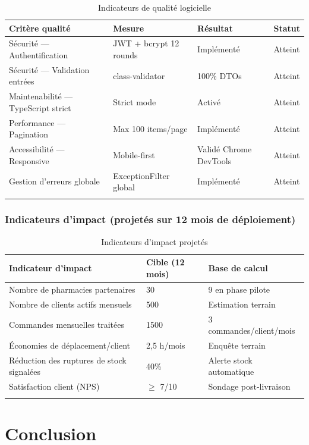 \documentclass[12pt,a4paper,oneside]{report}
\begin{document}
\begin{longtable}{L{5cm}L{3cm}L{3cm}L{3cm}}
  \toprule
  \textbf{Critère qualité} & \textbf{Mesure} & \textbf{Résultat} & \textbf{Statut} \\
  \midrule
  Sécurité — Authentification & JWT + bcrypt 12 rounds & Implémenté & Atteint \\
  Sécurité — Validation entrées & class-validator & 100\% DTOs & Atteint \\
  Maintenabilité — TypeScript strict & Strict mode & Activé & Atteint \\
  Performance — Pagination & Max 100 items/page & Implémenté & Atteint \\
  Accessibilité — Responsive & Mobile-first & Validé Chrome DevTools & Atteint \\
  Gestion d'erreurs globale & ExceptionFilter global & Implémenté & Atteint \\
  \bottomrule
  \caption{Indicateurs de qualité logicielle}
\end{longtable}

\subsection{Indicateurs d'impact (projetés sur 12 mois de déploiement)}

\begin{longtable}{L{7cm}L{3cm}L{4cm}}
  \toprule
  \textbf{Indicateur d'impact} & \textbf{Cible (12 mois)} & \textbf{Base de calcul} \\
  \midrule
  Nombre de pharmacies partenaires & 30 & 9 en phase pilote \\
  Nombre de clients actifs mensuels & 500 & Estimation terrain \\
  Commandes mensuelles traitées & 1500 & 3 commandes/client/mois \\
  Économies de déplacement/client & 2,5 h/mois & Enquête terrain \\
  Réduction des ruptures de stock signalées & 40\% & Alerte stock automatique \\
  Satisfaction client (NPS) & $\geq$ 7/10 & Sondage post-livraison \\
  \bottomrule
  \caption{Indicateurs d'impact projetés}
\end{longtable}

\clearpage

\chapter*{Conclusion}
\end{document}
